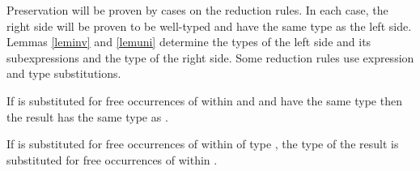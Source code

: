 Preservation will be proven by cases on the reduction rules.  In each case, the right side will be proven to be well-typed and have the same type as the left side.  Lemmas \ref{leminv} and \ref{lemuni} determine the types of the left side and its subexpressions and the type of the right side.  Some reduction rules use expression and type substitutions.

If \first{\varexph} is substituted for free occurrences of \first{\varvarh} within \second{\varexph} and \first{\varexph} and \first{\varvarh} have the same type then the result has the same type as \second{\varexph}.



If \first{\vartyh} is substituted for free occurrences of \first{\tyvarh} within \first{\varexph} of type \second{\vartyh}, the type of the result is \first{\vartyh} substituted for free occurrences of \tyvarh within \second{\vartyh}.






